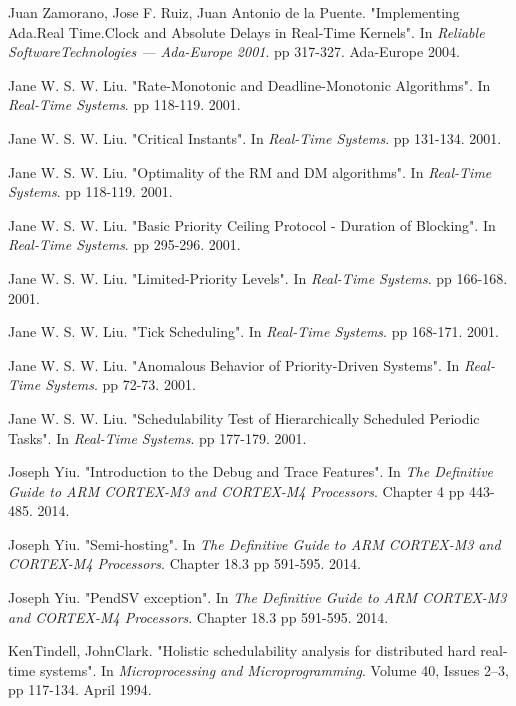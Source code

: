 \documentclass{article}
\begin{document}
\begin{thebibliography}{1}
Juan Zamorano, Jose F. Ruiz, Juan Antonio de la Puente.
\newblock "Implementing Ada.Real Time.Clock and Absolute Delays in Real-Time Kernels".
\newblock In {\em Reliable SoftwareTechnologies — Ada-Europe 2001}. pp 317-327. Ada-Europe 2004.

Jane W. S. W. Liu.
\newblock "Rate-Monotonic and Deadline-Monotonic Algorithms".
\newblock In {\em Real-Time Systems}. pp 118-119. 2001.

Jane W. S. W. Liu.
\newblock "Critical Instants".
\newblock In {\em Real-Time Systems}. pp 131-134. 2001.

Jane W. S. W. Liu.
\newblock "Optimality of the RM and DM algorithms".
\newblock In {\em Real-Time Systems}. pp 118-119. 2001.

Jane W. S. W. Liu.
\newblock "Basic Priority Ceiling Protocol - Duration of Blocking".
\newblock In {\em Real-Time Systems}. pp 295-296. 2001.

Jane W. S. W. Liu.
\newblock "Limited-Priority Levels".
\newblock In {\em Real-Time Systems}. pp 166-168. 2001.

Jane W. S. W. Liu.
\newblock "Tick Scheduling".
\newblock In {\em Real-Time Systems}. pp 168-171. 2001.

Jane W. S. W. Liu.
\newblock "Anomalous Behavior of Priority-Driven Systems".
\newblock In {\em Real-Time Systems}. pp 72-73. 2001.

Jane W. S. W. Liu.
\newblock "Schedulability Test of Hierarchically Scheduled Periodic Tasks".
\newblock In {\em Real-Time Systems}. pp 177-179. 2001.

Joseph Yiu.
\newblock "Introduction to the Debug and Trace Features".
\newblock In {\em The Definitive Guide to ARM CORTEX-M3 and CORTEX-M4 Processors}. Chapter 4 pp 443-485. 2014.

Joseph Yiu.
\newblock "Semi-hosting".
\newblock In {\em The Definitive Guide to ARM CORTEX-M3 and CORTEX-M4 Processors}. Chapter 18.3 pp 591-595. 2014.

Joseph Yiu.
\newblock "PendSV exception".
\newblock In {\em The Definitive Guide to ARM CORTEX-M3 and CORTEX-M4 Processors}. Chapter 18.3 pp 591-595. 2014.

KenTindell, JohnClark.
\newblock "Holistic schedulability analysis for distributed hard real-time systems".
\newblock In {\em Microprocessing and Microprogramming}. Volume 40, Issues 2–3, pp 117-134. April 1994.


\end{thebibliography}
\end{document}
